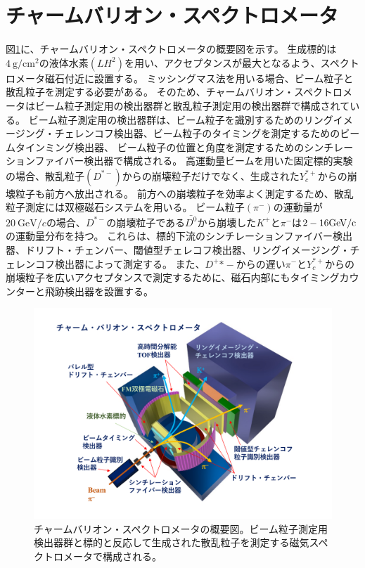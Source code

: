 \section{チャームバリオン・スペクトロメータ}
図\ref{spectrometer}に、チャームバリオン・スペクトロメータの概要図を示す。
生成標的は$\SI{4}{\g / \cm^2}$の液体水素$(LH^2)$を用い、アクセプタンスが最大となるよう、スペクトロメータ磁石付近に設置する。
ミッシングマス法を用いる場合、ビーム粒子と散乱粒子を測定する必要がある。
そのため、チャームバリオン・スペクトロメータはビーム粒子測定用の検出器群と散乱粒子測定用の検出器群で構成されている。
ビーム粒子測定用の検出器群は、ビーム粒子を識別するためのリングイメージング・チェレンコフ検出器、ビーム粒子のタイミングを測定するためのビームタインミング検出器、
ビーム粒子の位置と角度を測定するためのシンチレーションファイバー検出器で構成される。
高運動量ビームを用いた固定標的実験の場合、散乱粒子$(D^{*-})$からの崩壊粒子だけでなく、生成された$Y_c^{*+}$からの崩壊粒子も前方へ放出される。
前方への崩壊粒子を効率よく測定するため、散乱粒子測定には双極磁石システムを用いる。
ビーム粒子$(\pi^-)$の運動量が$\SI{20}{\GeV/c}$の場合、$D^{*-}$の崩壊粒子である$\bar{D^0}$から崩壊した$K^+$と$\pi^-$は$2-16\space\si{\GeV/c}$の運動量分布を持つ。
これらは、標的下流のシンチレーションファイバー検出器、ドリフト・チェンバー、閾値型チェレコフ検出器、リングイメージング・チェレンコフ検出器によって測定する。
また、$D^+{*-}$からの遅い$\pi^-$と$Y_c^{*+}$からの崩壊粒子を広いアクセプタンスで測定するために、磁石内部にもタイミングカウンターと飛跡検出器を設置する。


\begin{figure}[htbp]
  \label{spectrometer}
  \centering
  \includegraphics[width=15cm]{images/chapter1/spectrometer.pdf}
  \caption{チャームバリオン・スペクトロメータの概要図。ビーム粒子測定用検出器群と標的と反応して生成された散乱粒子を測定する磁気スペクトロメータで構成される。}
\end{figure}